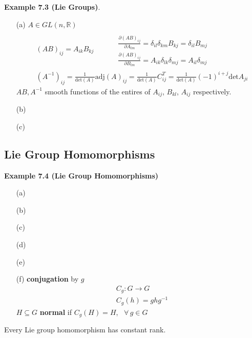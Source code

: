 \textbf{Example 7.3 (Lie Groups)}.  
\begin{enumerate}
\item[(a)]$A \in GL(n,\mathbb{R})$
\[
\begin{aligned}
  & (AB)_{ij} = A_{ik} B_{kj} \quad \quad \, \begin{aligned} & \quad \\ 
    & \frac{ \partial (AB)_{ij} }{ \partial A_{lm} } = \delta_{il} \delta_{km} B_{kj} = \delta_{il} B_{mj} \\ 
    & \frac{ \partial (AB)_{ij} }{ \partial B_{lm} } = A_{ik} \delta_{lk} \delta_{mj} = A_{il} \delta_{mj} \end{aligned} \\
  & (A^{-1})_{ij} = \frac{1}{ \text{det}(A)} \text{adj}(A)_{ij} = \frac{1}{ \text{det}(A) } C^T_{ij} = \frac{1}{ \text{det}(A)}(-1)^{i+j}\text{det}A_{ji}
\end{aligned}
\]
$AB,A^{-1}$ smooth functions of the entires of $A_{ij}$, $B_{kl}$, $A_{ij}$ respectively.
\item[(b)]
\item[(c)]
\end{enumerate}

\subsection*{Lie Group Homomorphisms}

\textbf{Example 7.4 (Lie Group Homomorphisms)}

\begin{enumerate}
\item[(a)]
\item[(b)]
\item[(c)]
\item[(d)]
\item[(e)]
\item[(f)] \textbf{conjugation} by $g$
\[
\begin{aligned}
  & C_g : G \to G \\ 
  & C_g(h) = ghg^{-1}
\end{aligned}
\]
$H \subseteq G$ \textbf{normal} if $C_g(H) = H$, \, $\forall \, g \in G$
\end{enumerate}

\begin{theorem}[7.5]
  Every Lie group homomorphism has constant rank.
\end{theorem}


